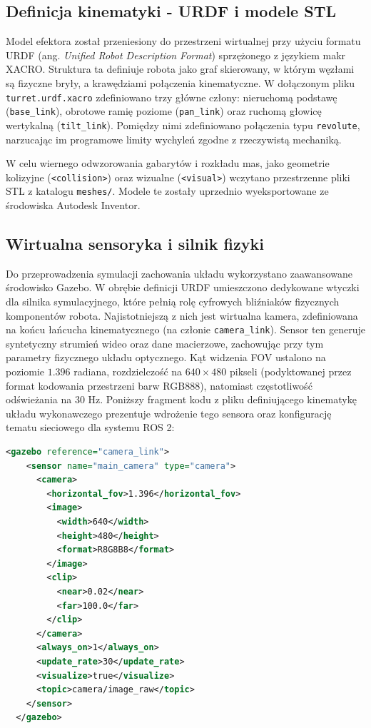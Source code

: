 \documentclass[a4paper,twoside,12pt]{book}
\begin{document}
\subsection{Definicja kinematyki - URDF i modele STL}
Model efektora został przeniesiony do przestrzeni wirtualnej przy użyciu formatu URDF (ang. \textit{Unified Robot Description Format}) sprzężonego z językiem makr XACRO. Struktura ta definiuje robota jako graf skierowany, w którym węzłami są fizyczne bryły, a krawędziami połączenia kinematyczne. W dołączonym pliku \texttt{turret.urdf.xacro} zdefiniowano trzy główne człony: nieruchomą podstawę (\texttt{base\_link}), obrotowe ramię poziome (\texttt{pan\_link}) oraz ruchomą głowicę wertykalną (\texttt{tilt\_link}). Pomiędzy nimi zdefiniowano połączenia typu \texttt{revolute}, narzucając im programowe limity wychyleń zgodne z rzeczywistą mechaniką.

W celu wiernego odwzorowania gabarytów i rozkładu mas, jako geometrie kolizyjne (\texttt{<collision>}) oraz wizualne (\texttt{<visual>}) wczytano przestrzenne pliki STL z katalogu \texttt{meshes/}. Modele te zostały uprzednio wyeksportowane ze środowiska Autodesk Inventor.

\subsection{Wirtualna sensoryka i silnik fizyki}
Do przeprowadzenia symulacji zachowania układu wykorzystano zaawansowane środowisko Gazebo. W obrębie definicji URDF umieszczono dedykowane wtyczki dla silnika symulacyjnego, które pełnią rolę cyfrowych bliźniaków fizycznych komponentów robota. Najistotniejszą z nich jest wirtualna kamera, zdefiniowana na końcu łańcucha kinematycznego (na członie \texttt{camera\_link}). Sensor ten generuje syntetyczny strumień wideo oraz dane macierzowe, zachowując przy tym parametry fizycznego układu optycznego. Kąt widzenia FOV ustalono na poziomie $1.396$ radiana, rozdzielczość na $640 \times 480$ pikseli (podyktowanej przez format kodowania przestrzeni barw RGB888), natomiast częstotliwość odświeżania na 30 Hz. Poniższy fragment kodu z pliku definiującego kinematykę układu wykonawczego prezentuje wdrożenie tego sensora oraz konfigurację tematu sieciowego dla systemu ROS 2:

\newpage
\begin{lstlisting}[language=XML, basicstyle=\ttfamily\small, frame=single, breaklines=true]
  <gazebo reference="camera_link">
    <sensor name="main_camera" type="camera">
      <camera>
        <horizontal_fov>1.396</horizontal_fov>
        <image>
          <width>640</width>
          <height>480</height>
          <format>R8G8B8</format>
        </image>
        <clip>
          <near>0.02</near>
          <far>100.0</far>
        </clip>
      </camera>
      <always_on>1</always_on>
      <update_rate>30</update_rate>
      <visualize>true</visualize>
      <topic>camera/image_raw</topic>
    </sensor>
  </gazebo>
\end{lstlisting}
\end{document}
